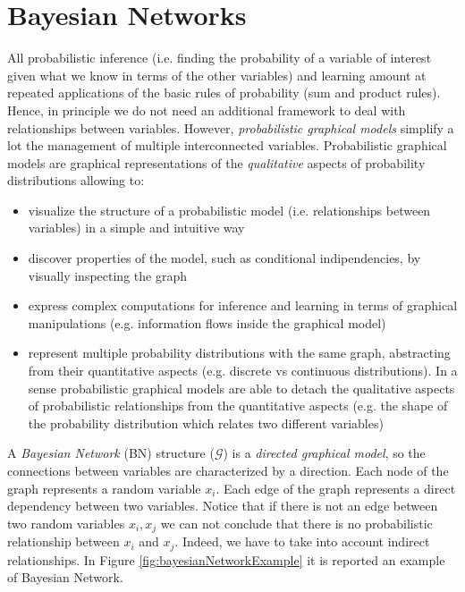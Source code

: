\chapter{Bayesian Networks}
\label{cha:bay_net}
All probabilistic inference (i.e. finding the probability of a variable of interest given what we know in terms of the other variables) and learning amount at repeated applications of the basic rules of probability (sum and product rules). Hence, in principle we do not need an additional framework to deal with relationships between variables. However, \textit{probabilistic graphical models} simplify a lot the management of multiple interconnected variables. Probabilistic graphical models are graphical representations of the \textit{qualitative} aspects of probability distributions allowing to:
\begin{itemize}
    \item visualize the structure of a probabilistic model (i.e. relationships between variables) in a simple and intuitive way
    \item discover properties of the model, such as conditional indipendencies, by visually inspecting the graph
    \item express complex computations for inference and learning in terms of graphical manipulations (e.g. information flows inside the graphical model)
    \item represent multiple probability distributions with the same graph, abstracting from their quantitative aspects (e.g. discrete vs continuous distributions). In a sense probabilistic graphical models are able to detach the qualitative aspects of probabilistic relationships from the quantitative aspects (e.g. the shape of the probability distribution which relates two different variables)
\end{itemize}

A \textit{Bayesian Network} (BN) structure ($\mathcal{G}$) is a \textit{directed graphical model}, so the connections between variables are characterized by a direction. Each node of the graph represents a random variable $x_i$. Each edge of the graph represents a direct dependency between two variables. Notice that if there is not an edge between two random variables $x_i, x_j$ we can not conclude that there is no probabilistic relationship between $x_i$ and $x_j$. Indeed, we have to take into account indirect relationships. In Figure \ref{fig:bayesianNetworkExample} it is reported an example of Bayesian Network. \newline

